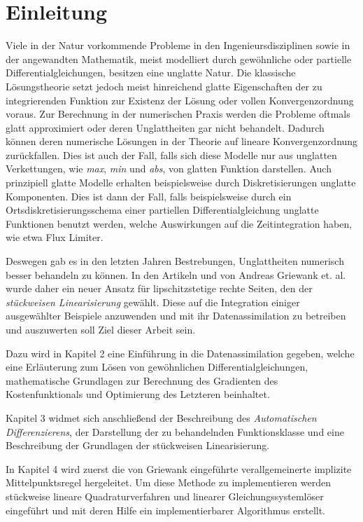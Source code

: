 \chapter{Einleitung}
Viele in der Natur vorkommende Probleme in den Ingenieursdisziplinen sowie in der angewandten Mathematik, meist modelliert durch gewöhnliche oder partielle Differentialgleichungen, besitzen eine unglatte Natur. Die klassische Lösungstheorie setzt jedoch meist hinreichend glatte Eigenschaften der zu integrierenden Funktion zur Existenz der Lösung oder vollen Konvergenzordnung voraus. Zur Berechnung in der numerischen Praxis werden die Probleme oftmals glatt approximiert oder deren Unglattheiten gar nicht behandelt. Dadurch können deren numerische Lösungen in der Theorie auf lineare Konvergenzordnung zurückfallen. Dies ist auch der Fall, falls sich diese Modelle nur aus unglatten Verkettungen, wie \textit{max}, \textit{min} und \textit{abs}, von glatten Funktion darstellen. Auch prinzipiell glatte Modelle erhalten beispielsweise durch Diskretisierungen unglatte Komponenten. Dies ist dann der Fall, falls beispielsweise durch ein Ortsdiskretisierungsschema einer partiellen Differentialgleichung unglatte Funktionen benutzt werden, welche Auswirkungen auf die Zeitintegration haben, wie etwa Flux Limiter.

Deswegen gab es in den letzten Jahren Bestrebungen, Unglattheiten numerisch besser behandeln zu können. In den Artikeln \cite{monster} und \cite{plan} von Andreas Griewank et. al. wurde daher ein neuer Ansatz für lipschitzstetige rechte Seiten, den der \textit{stückweisen Linearisierung} gewählt. Diese auf die Integration einiger ausgewählter Beispiele anzuwenden und mit ihr Datenassimilation zu betreiben und auszuwerten soll Ziel dieser Arbeit sein.

Dazu wird in Kapitel 2 eine Einführung in die Datenassimilation gegeben, welche eine Erläuterung zum Lösen von gewöhnlichen Differentialgleichungen, mathematische Grundlagen zur Berechnung des Gradienten des Kostenfunktionals und Optimierung des Letzteren beinhaltet.

Kapitel 3 widmet sich anschließend der Beschreibung des \textit{Automatischen Differenzierens}, der Darstellung der zu behandelnden Funktionsklasse und eine Beschreibung der Grundlagen der stückweisen Linearisierung.

In Kapitel 4 wird zuerst die von Griewank eingeführte verallgemeinerte implizite Mittelpunktsregel hergeleitet. Um diese Methode zu implementieren werden stückweise lineare Quadraturverfahren und linearer Gleichungssystemlöser eingeführt und mit deren Hilfe ein implementierbarer Algorithmus erstellt.

